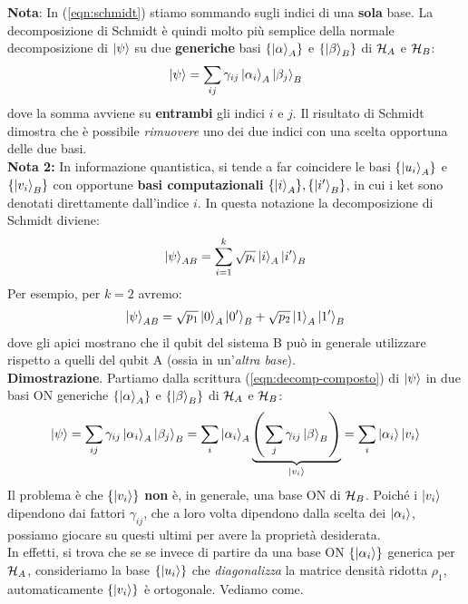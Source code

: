 \documentclass[../../InformazioneQuantistica.tex]{subfiles}
\begin{document}
\textbf{Nota}: In (\ref{eqn:schmidt}) stiamo sommando sugli indici di una \textbf{sola} base. La decomposizione di Schmidt è quindi molto più semplice della normale decomposizione di $\Ket{\psi}$ su due \textbf{generiche} basi $\{\Ket{\alpha}_A\}$ e $\{\Ket{\beta}_B\}$ di $\mathcal{H}_A$ e $\mathcal{H}_B$:
\begin{align}
\Ket{\psi} = \sum_{ij} \gamma_{ij}\Ket{\alpha_i}_A\Ket{\beta_j}_B\label{eqn:decomp-composto}
\end{align}
dove la somma avviene su \textbf{entrambi} gli indici $i$ e $j$. Il risultato di Schmidt dimostra che è possibile \textit{rimuovere} uno dei due indici con una scelta opportuna delle due basi.\\

\textbf{Nota 2:} In informazione quantistica, si tende a far coincidere le basi $\{\Ket{u_i}_A\}$ e $\{\Ket{v_i}_B\}$ con opportune \textbf{basi computazionali} $\{\Ket{i}_A\}, \{\Ket{i'}_B\}$, in cui i ket sono denotati  direttamente dall'indice $i$. In questa notazione la decomposizione di Schmidt diviene:
\begin{align*}
\Ket{\psi}_{AB} =\sum_{i=1}^k \sqrt{p_i} \Ket{i}_A \Ket{i'}_B
\end{align*}
Per esempio, per $k=2$ avremo:
\begin{align*}
\Ket{\psi}_{AB} = \sqrt{p_1}\Ket{0}_A \Ket{0'}_B + \sqrt{p_2}\Ket{1}_A \Ket{1'}_B
\end{align*}
dove gli apici mostrano che il qubit del sistema B può in generale utilizzare  rispetto a quelli del qubit A (ossia in un'\textit{altra base}).\\

\textbf{Dimostrazione}.
Partiamo dalla scrittura (\ref{eqn:decomp-composto}) di $\Ket{\psi}$ in due basi ON generiche $\{\Ket{\alpha}_A\}$ e $\{\Ket{\beta}_B\}$ di $\mathcal{H}_A$ e $\mathcal{H}_B$:
\begin{align}
\Ket{\psi} = \sum_{ij}\gamma_{ij}\Ket{\alpha_i}_A\Ket{\beta_j}_B = \sum_i \Ket{\alpha_i}_A \underbrace{\left( \sum_{j} \gamma_{ij} \Ket{\beta}_B\right)}_{\Ket{v_i}} = \sum_i \Ket{\alpha_i}\Ket{v_i}
\label{eqn:passo-decomp}
\end{align}
Il problema è che $\{\Ket{v_i}\}$ \textbf{non} è, in generale, una base ON di $\mathcal{H}_B$. Poiché i $\Ket{v_i}$ dipendono dai fattori $\gamma_{ij}$, che a loro volta dipendono dalla scelta dei $\Ket{\alpha_i}$, possiamo giocare su questi ultimi per avere la proprietà desiderata.\\
In effetti, si trova che se se invece di partire da una base ON $\{\Ket{\alpha_i}\}$ generica per $\mathcal{H}_A$, consideriamo la base $\{\Ket{u_i}\}$ che \textit{diagonalizza} la matrice densità ridotta $\rho_1$, automaticamente $\{\Ket{v_i}\}$ è ortogonale. Vediamo come.\\
\end{document}
